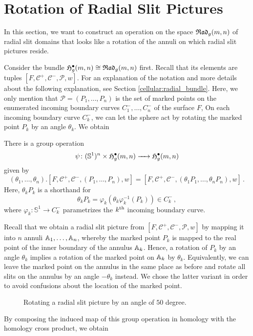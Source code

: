\section{Rotation of Radial Slit Pictures}
\label{homology_operations:rotation}

In this section, we want to construct an operation on the space ${\mathfrak{Rad}_g(m,n)}$ of radial slit domains that looks like a rotation of the annuli on which radial slit pictures reside.

Consider the bundle $\mathfrak{H}^{\bullet}_g(m, n) \cong {\mathfrak{Rad}_g(m,n)}$ first.
Recall that its elements are tuples $[F, \mathcal C^+, \mathcal C^-, \mathcal P, w]$.
For an explanation of the notation and more details about the following explanation, see Section \ref{cellular:radial_bundle}.
Here, we only mention that $\mathcal P = (P_1, \dotsc, P_n)$ is the set of marked points on the enumerated incoming boundary curves $C^-_1, \dotsc, C^-_n$ of the surface $F$, 
On each incoming boundary curve $C^-_k$, we can let the sphere act by rotating the marked point $P_k$ by an angle $\theta_k$.
We obtain

\begin{defi}
   There is a group operation
  \[
    \psi \colon (\mathbb S^1)^n \times \mathfrak{H}^{\bullet}_g(m, n) \xrightarrow{\hspace{6pt}{}\hspace{6pt}} \mathfrak{H}^{\bullet}_g(m, n)
  \]
  given by
  \[
    (\theta_1, \dotsc, \theta_n).[F, \mathcal C^+, \mathcal C^-, (P_1, \dotsc, P_n), w] = [F, \mathcal C^+, \mathcal C^-, (\theta_1 P_1, \dotsc, \theta_n P_n), w]\,.
  \]
  Here, $\theta_k P_k$ is a shorthand for 
  \[
  \theta_k P_k = \varphi_k(\theta_k\varphi_k^{-1}(P_k)) \in C^-_k\,,
  \]
  where $\varphi_k \colon \mathbb S^1 \to C^-_k$ parametrizes the $k^{\text{th}}$ incoming boundary curve.
\end{defi}

Recall that we obtain a radial slit picture from $[F, \mathcal C^+, \mathcal C^-, \mathcal P, w]$ by mapping it into $n$ annuli $\mathbb A_1, \dotsc, \mathbb A_n$,
whereby the marked point $P_k$ is mapped to the real point of the inner boundary of the annulus $\mathbb A_k$.
Hence, a rotation of $P_k$ by an angle $\theta_k$ implies a rotation of the marked point on $\mathbb A_k$ by $\theta_k$.
Equivalently, we can leave the marked point on the annulus in the same place as before and rotate all slits on the annulus by an angle $-\theta_k$ instead.
We chose the latter variant in order to avoid confusions about the location of the marked point.
\begin{figure}[ht]
  \centering
  \caption{\label{rotation} Rotating a radial slit picture by an angle of $50$ degree.}
  \end{figure}
By composing the induced map of this group operation in homology with the homology cross product, we obtain

